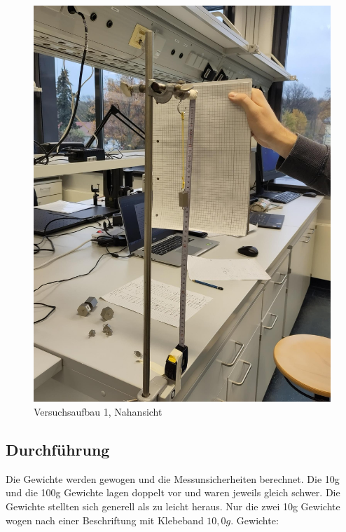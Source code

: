 \documentclass[
]{article}
\begin{document}
\begin{figure}
\centering
\includegraphics[width=\textwidth,height=0.2\textheight]{Bilder/V2B2.jpeg}
\caption{Versuchsaufbau 1, Nahansicht}
\end{figure}

\hypertarget{durchfuxfchrung}{%
\subsection{Durchführung}\label{durchfuxfchrung}}

Die Gewichte werden gewogen und die Messunsicherheiten berechnet. Die
10g und die 100g Gewichte lagen doppelt vor und waren jeweils gleich
schwer. Die Gewichte stellten sich generell als zu leicht heraus. Nur
die zwei 10g Gewichte wogen nach einer Beschriftung mit Klebeband
\(10,0g\). Gewichte:
\end{document}
